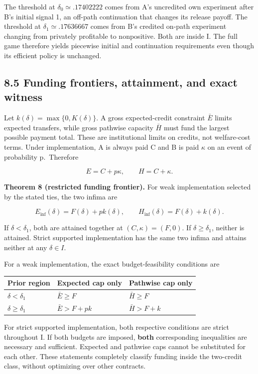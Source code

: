 \documentclass[
  11pt,
]{article}
\begin{document}
The threshold at \(\delta_0\simeq .17402222\) comes from A's uncredited
own experiment after B's initial signal 1, an off-path continuation that
changes its release payoff. The threshold at
\(\delta_1\simeq .17636667\) comes from B's credited on-path experiment
changing from privately profitable to nonpositive. Both are inside I.
The full game therefore yields piecewise initial and continuation
requirements even though its efficient policy is unchanged.

\subsection{8.5 Funding frontiers, attainment, and exact
witness}\label{funding-frontiers-attainment-and-exact-witness}

Let \(k(\delta)=\max\{0,K(\delta)\}\). A gross expected-credit
constraint \(\bar E\) limits expected transfers, while gross pathwise
capacity \(\bar H\) must fund the largest possible payment total. These
are institutional limits on credits, not welfare-cost terms. Under
implementation, A is always paid C and B is paid \(\kappa\) on an event
of probability p.~Therefore

\[E=C+p\kappa,\qquad H=C+\kappa. \tag{19}\]

\textbf{Theorem 8 (restricted funding frontier).} For weak
implementation selected by the stated ties, the two infima are

\[E_{\inf}(\delta)=F(\delta)+p k(\delta),\qquad
H_{\inf}(\delta)=F(\delta)+k(\delta). \tag{20}\]

If \(\delta<\delta_1\), both are attained together at
\((C,\kappa)=(F,0)\). If \(\delta\geq\delta_1\), neither is attained.
Strict supported implementation has the same two infima and attains
neither at any \(\delta\in I\).

For a weak implementation, the exact budget-feasibility conditions are

\begin{longtable}[]{@{}lll@{}}
\toprule\noalign{}
Prior region & Expected cap only & Pathwise cap only \\
\midrule\noalign{}
\endhead
\bottomrule\noalign{}
\endlastfoot
\(\delta<\delta_1\) & \(\bar E\geq F\) & \(\bar H\geq F\) \\
\(\delta\geq\delta_1\) & \(\bar E>F+pk\) & \(\bar H>F+k\) \\
\end{longtable}

For strict supported implementation, both respective conditions are
strict throughout I. If both budgets are imposed, \textbf{both}
corresponding inequalities are necessary and sufficient. Expected and
pathwise caps cannot be substituted for each other. These statements
completely classify funding inside the two-credit class, without
optimizing over other contracts.
\end{document}

